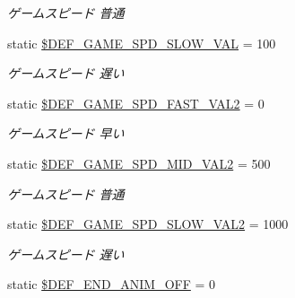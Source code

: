 \begin{DoxyCompactItemize}
\begin{DoxyCompactList}\small\item\em ゲームスピード 普通 \end{DoxyCompactList}\item 
\mbox{\label{class_reversi_const_ab34ef73bafe6b461bd6c352e393428c4}} 
static \hyperlink{class_reversi_const_ab34ef73bafe6b461bd6c352e393428c4}{\$\+D\+E\+F\+\_\+\+G\+A\+M\+E\+\_\+\+S\+P\+D\+\_\+\+S\+L\+O\+W\+\_\+\+V\+AL} = 100
\begin{DoxyCompactList}\small\item\em ゲームスピード 遅い \end{DoxyCompactList}\item 
\mbox{\label{class_reversi_const_a6fa812c8bbe57a64fd92223fd3b71086}} 
static \hyperlink{class_reversi_const_a6fa812c8bbe57a64fd92223fd3b71086}{\$\+D\+E\+F\+\_\+\+G\+A\+M\+E\+\_\+\+S\+P\+D\+\_\+\+F\+A\+S\+T\+\_\+\+V\+A\+L2} = 0
\begin{DoxyCompactList}\small\item\em ゲームスピード 早い \end{DoxyCompactList}\item 
\mbox{\label{class_reversi_const_a016bb70e8fca576083b82f70c5abf022}} 
static \hyperlink{class_reversi_const_a016bb70e8fca576083b82f70c5abf022}{\$\+D\+E\+F\+\_\+\+G\+A\+M\+E\+\_\+\+S\+P\+D\+\_\+\+M\+I\+D\+\_\+\+V\+A\+L2} = 500
\begin{DoxyCompactList}\small\item\em ゲームスピード 普通 \end{DoxyCompactList}\item 
\mbox{\label{class_reversi_const_a6742adf1a0780356fd92b8a18c1710c8}} 
static \hyperlink{class_reversi_const_a6742adf1a0780356fd92b8a18c1710c8}{\$\+D\+E\+F\+\_\+\+G\+A\+M\+E\+\_\+\+S\+P\+D\+\_\+\+S\+L\+O\+W\+\_\+\+V\+A\+L2} = 1000
\begin{DoxyCompactList}\small\item\em ゲームスピード 遅い \end{DoxyCompactList}\item 
\mbox{\label{class_reversi_const_a61944ae88b15f2b7a1e0fafa6427b1d9}} 
static \hyperlink{class_reversi_const_a61944ae88b15f2b7a1e0fafa6427b1d9}{\$\+D\+E\+F\+\_\+\+E\+N\+D\+\_\+\+A\+N\+I\+M\+\_\+\+O\+FF} = 0

\end{DoxyCompactItemize}
